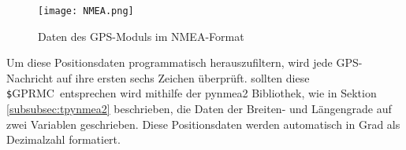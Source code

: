 \begin{figure}[h]
\centering
\texttt{[image: NMEA.png]}
\caption{Daten des GPS-Moduls im NMEA-Format}
\label{fig:NMEA}
\end{figure}

Um diese Positionsdaten programmatisch herauszufiltern, wird jede GPS-Nachricht auf ihre ersten sechs Zeichen überprüft. sollten diese \glqq \verb|$|GPRMC\grqq\ entsprechen wird mithilfe der pynmea2 Bibliothek, wie in Sektion \ref{subsubsec:tpynmea2} beschrieben, die Daten der Breiten- und Längengrade auf zwei Variablen geschrieben. Diese Positionsdaten werden automatisch in Grad als Dezimalzahl formatiert. 